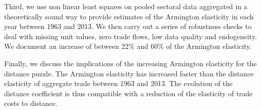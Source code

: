 \documentclass[12pt,twoside,a4paper,notitlepage]{article}
\begin{document}
Third, we use non linear least squares on pooled sectoral data aggregated in a theoretically sound way to provide estimates of the Armington elasticity in each year between 1963 and 2013.
We then carry out a series of robustness checks to deal with missing unit values, zero trade flows, low data quality and endogeneity.
We document an increase of between 22\% and 60\% of the Armington elasticity.  


Finally, we discuss the implications of the increasing Armington elasticity for the distance puzzle. 
The Armington elasticity has increased faster than the distance elasticity of aggregate trade between 1963 and 2013.
The evolution of the distance coefficient is thus compatible with a reduction of the elasticity of trade costs to distance.

\end{document}
